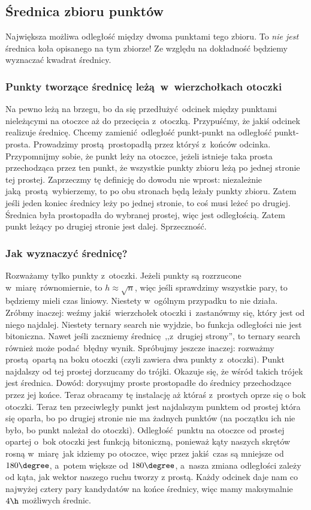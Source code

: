 \subsection*{Średnica zbioru punktów}
Największa możliwa odległość między dwoma punktami tego zbioru. To \emph{nie jest} średnica koła opisanego na tym zbiorze! Ze względu na dokładność będziemy wyznaczać kwadrat średnicy.
\subsubsection*{Punkty tworzące średnicę leżą w~wierzchołkach otoczki}
Na pewno leżą na brzegu, bo da się przedłużyć odcinek między punktami nieleżącymi na otoczce aż do przecięcia z~otoczką. Przypuśćmy, że jakiś odcinek realizuje średnicę. Chcemy zamienić odległość punkt-punkt na odległość punkt-prosta. Prowadzimy prostą prostopadłą przez któryś z~końców odcinka. Przypomnijmy sobie, że punkt leży na otoczce, jeżeli istnieje taka prosta przechodząca przez ten punkt, że wszystkie punkty zbioru leżą po jednej stronie tej prostej. Zaprzeczmy tę definicję do dowodu nie wprost: niezależnie jaką prostą wybierzemy, to po obu stronach będą leżały punkty zbioru. Zatem jeśli jeden koniec średnicy leży po jednej stronie, to coś musi leżeć po drugiej. Średnica była prostopadła do wybranej prostej, więc jest odległością. Zatem punkt leżący po drugiej stronie jest dalej. Sprzeczność.
\QED
\subsubsection*{Jak wyznaczyć średnicę?}
Rozważamy tylko punkty z~otoczki. Jeżeli punkty są rozrzucone w~miarę równomiernie, to \(h \approx \sqrt{n}\), więc jeśli sprawdzimy wszystkie pary, to będziemy mieli czas liniowy. Niestety w~ogólnym przypadku to nie działa. Zróbmy inaczej: weźmy jakiś wierzchołek otoczki i~zastanówmy się, który jest od niego najdalej. Niestety ternary search nie wyjdzie, bo funkcja odległości nie jest bitoniczna. Nawet jeśli zaczniemy średnicę ,,z~drugiej strony'', to ternary search również może podać błędny wynik. Spróbujmy jeszcze inaczej: rozważmy prostą opartą na boku otoczki (czyli zawiera dwa punkty z~otoczki). Punkt najdalszy od tej prostej dorzucamy do trójki. Okazuje się, że wśród takich trójek jest średnica. Dowód: dorysujmy proste prostopadłe do średnicy przechodzące przez jej końce. Teraz obracamy tę instalację aż któraś z~prostych oprze się o bok otoczki. Teraz ten przeciwległy punkt jest najdalszym punktem od prostej która się oparła, bo po drugiej stronie nie ma żadnych punktów (na początku ich nie było, bo punkt należał do otoczki). Odległość punktu na otoczce od prostej opartej o~bok otoczki jest funkcją bitoniczną, ponieważ kąty naszych skrętów rosną w~miarę jak idziemy po otoczce, więc przez jakiś czas są mniejsze od \(180\degree\), a~potem większe od \(180\degree\), a~nasza zmiana odległości zależy od kąta, jak wektor naszego ruchu tworzy z prostą. Każdy odcinek daje nam co najwyżej cztery pary kandydatów na końce średnicy, więc mamy maksymalnie \(4\h\) możliwych średnic.
